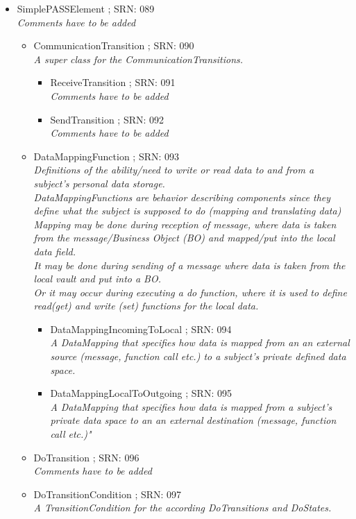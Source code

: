 \begin{itemize}
\item SimplePASSElement ; SRN: 089 \\ \textit{Comments have to be added}
\begin{itemize}
	\item CommunicationTransition ; SRN: 090 \\ \textit{A super class for the CommunicationTransitions.}
	\begin{itemize}
		\item ReceiveTransition ; SRN: 091 \\ \textit{Comments have to be added}
		\item SendTransition ; SRN: 092 \\ \textit{Comments have to be added}
	\end{itemize}
	\item DataMappingFunction ; SRN: 093 \\ \textit{Definitions of the ability/need to write or read data to and from a subject's personal data storage.\\
	DataMappingFunctions are behavior describing components since they define what the subject is supposed to do (mapping and translating data)\\
	Mapping may be done during reception of message, where data is taken from the message/Business Object (BO) and mapped/put into the local data field.\\
	It may be done during sending of a message where data is taken from the local vault and put into a BO.\\
	Or it may occur during executing a do function, where it is used to define read(get) and write (set) functions for the local data.}
	\begin{itemize}
		\item DataMappingIncomingToLocal ; SRN: 094 \\ \textit{A DataMapping that specifies how data is mapped from an an external source (message, function call etc.) to a subject's private defined data space.}
		\item DataMappingLocalToOutgoing ; SRN: 095 \\ \textit{A DataMapping that specifies how data is mapped from a subject's private data space to an an external destination (message, function call etc.)" }
	\end{itemize}
	\item DoTransition ; SRN: 096 \\ \textit{Comments have to be added}
	\item DoTransitionCondition ; SRN: 097 \\ \textit{A TransitionCondition for the according DoTransitions and DoStates.}

\end{itemize}
\end{itemize}
